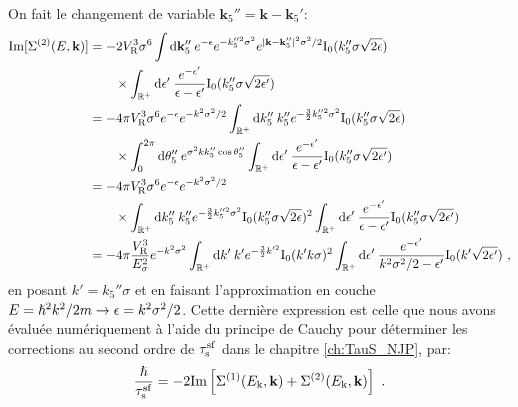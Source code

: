 On fait le changement de variable $\mathbf{k}_{\mathrm{5}}''=\mathbf{k}-\mathbf{k}_{\mathrm{5}}'$:
\begin{align}
\mathrm{Im}[ \Sigma^{(2)}(E,\mathbf{k})]&= -2V_{\mathrm{R}}^3\sigma^6 \int{\mathop{}\mathopen{}\mathrm{d}\mathbf{k}_{\mathrm{5}}'' \: e^{-\epsilon} e^{-k_{\mathrm{5}}''^2\sigma^2} e^{|\mathbf{k}-\mathbf{k}_{\mathrm{5}}''|^2\sigma^2/2} \mathrm{I_0}(k_{\mathrm{5}}''\sigma \sqrt{2\epsilon})} \\
&\nonumber\qquad \times \int_{\mathbb{R}^+}{\mathop{}\mathopen{}\mathrm{d}\epsilon' \: \frac{e^{-\epsilon'}}{\epsilon-\epsilon'} \mathrm{I_0}(k_{\mathrm{5}}'' \sigma \sqrt{2\epsilon'})} \\
&=-4 \pi V_{\mathrm{R}}^3\sigma^6 e^{-\epsilon} e^{-k^2\sigma^2/2} \int_{\mathbb{R}^+}{\mathop{}\mathopen{}\mathrm{d} k_{\mathrm{5}}'' \: k_{\mathrm{5}}'' e^{-\frac{3}{2}k_{\mathrm{5}}''^2 \sigma^2} \mathrm{I_0}(k_{\mathrm{5}}'' \sigma \sqrt{2\epsilon})} \\
&\nonumber \qquad \times \int_0^{2\pi}{\mathop{}\mathopen{}\mathrm{d}\theta_{\mathrm{5}}'' \: e^{\sigma^2 k k_{\mathrm{5}}'' \cos\theta_{\mathrm{5}}''} \int_{\mathbb{R}^+}{\mathop{}\mathopen{}\mathrm{d} \epsilon' \: \frac{e^{-\epsilon'}}{\epsilon-\epsilon'} \mathrm{I_0}(k_{\mathrm{5}}'' \sigma \sqrt{2\epsilon'})}} \\
&=-4 \pi V_{\mathrm{R}}^3\sigma^6 e^{-\epsilon} e^{-k^2\sigma^2/2} \\
&\nonumber \qquad \times\int_{\mathbb{R}^+}{\mathop{}\mathopen{}\mathrm{d} k_{\mathrm{5}}'' \: k_{\mathrm{5}}'' e^{-\frac{3}{2}k_{\mathrm{5}}''^2 \sigma^2} \mathrm{I_0}(k_{\mathrm{5}}'' \sigma \sqrt{2\epsilon})^2 \int_{\mathbb{R}^+}{\mathop{}\mathopen{}\mathrm{d} \epsilon' \: \frac{e^{-\epsilon'}}{\epsilon-\epsilon'} \mathrm{I_0}(k_{\mathrm{5}}'' \sigma \sqrt{2\epsilon'})}} \\
&= -4 \pi \frac{V_{\mathrm{R}}^3}{E_{\sigma}^2} e^{-k^2\sigma^2} \int_{\mathbb{R}^+}{\mathop{}\mathopen{}\mathrm{d} k' \: k' e^{-\frac{3}{2}k'^2} \mathrm{I_0}(k' k \sigma)^2 \int_{\mathbb{R}^+}{\mathop{}\mathopen{}\mathrm{d} \epsilon' \: \frac{e^{-\epsilon'}}{k^2\sigma^2/2-\epsilon'} \mathrm{I_0}(k' \sqrt{2\epsilon'})}} \text{ ,}
\end{align}
en posant $k'=k_{\mathrm{5}}''\sigma$ et en faisant l'approximation en couche $E=\hslash^2k^2/2m \rightarrow \epsilon=k^2\sigma^2/2$. Cette dernière expression est celle que nous avons évaluée numériquement à l'aide du principe de Cauchy pour déterminer les corrections au second ordre de $\tau_{\mathrm{s}}^{\mathrm{sf}}$ dans le chapitre \ref{ch:TauS_NJP}, par:
\begin{equation}
\frac{\hslash}{\tau_{\mathrm{s}}^{\mathrm{sf}}}=-2 \mathrm{Im}\left[\Sigma^{(1)}(E_{\mathrm{k}},\mathbf{k})+\Sigma^{(2)}(E_{\mathrm{k}},\mathbf{k})\right] \text{ .}
\end{equation}